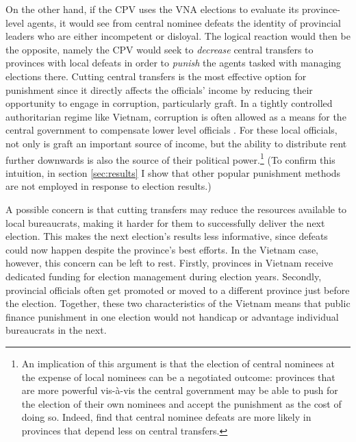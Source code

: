 \documentclass[12pt]{article}
\newcommand{\1}{\mathbbm{1}}
\begin{document}
On the other hand, if the CPV uses the VNA elections to evaluate its province-level agents, it would see from central nominee defeats the identity of provincial leaders who are either incompetent or disloyal. The logical reaction would then be the opposite, namely the CPV would seek to \textit{decrease} central transfers to provinces with local defeats in order to \textit{punish} the agents tasked with managing elections there. Cutting central transfers is the most effective option for punishment since it directly affects the officials' income by reducing their opportunity to engage in corruption, particularly graft. In a tightly controlled authoritarian regime like Vietnam, corruption is often allowed as a means for the central government to compensate lower level officials \citep{Darden2008}. For these local officials, not only is graft an important source of income, but the ability to distribute rent further downwards is also the source of their political power.\footnote{An implication of this argument is that the election of central nominees at the expense of local nominees can be a negotiated outcome: provinces that are more powerful vis-\`{a}-vis the central government may be able to push for the election of their own nominees and accept the punishment as the cost of doing so. Indeed, \cite{MaleskySchuler2011} find that central nominee defeats are more likely in provinces that depend less on central transfers.} (To confirm this intuition, in section \ref{sec:results} I show that other popular punishment methods are not employed in response to election results.)

A possible concern is that cutting transfers may reduce the resources available to local bureaucrats, making it harder for them to successfully deliver the next election. This makes the next election's results less informative, since defeats could now happen despite the province's best efforts. In the Vietnam case, however, this concern can be left to rest. Firstly, provinces in Vietnam receive dedicated funding for election management during election years. Secondly, provincial officials often get promoted or moved to a different province just before the election. Together, these two characteristics of the Vietnam means that public finance punishment in one election would not handicap or advantage individual bureaucrats in the next.
\end{document}
